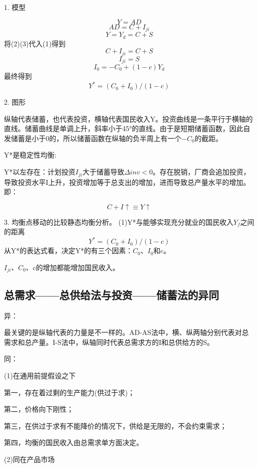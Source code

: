 \documentclass{article}
\begin{document}
1. 模型

\begin{equation}
	Y=AD
\end{equation}
\begin{equation}
	AD=C+I_{ji}
\end{equation}
\begin{equation}
	Y=Y_d=C+S
\end{equation}
将(2)(3)代入(1)得到
\[
C+I_{ji}=C+S
\]
\[
I_{ji}=S
\]
\[
I_{0}=-C_0+(1-c)Y_d
\]
最终得到
\[
Y^*=(C_0+I_0)/(1-c)
\]

\hspace*{\fill}

2. 图形

纵轴代表储蓄，也代表投资，横轴代表国民收入Y。投资曲线是一条平行于横轴的直线。储蓄曲线是单调上升，斜率小于45°的直线。由于是短期储蓄函数，因此自发储蓄是小于0的，所以储蓄函数在纵轴的负半周上有一个$ -C_0 $的截距。

Y*是稳定性均衡:

Y*以左存在：计划投资$ I_{ji} $大于储蓄导致$ \Delta inv<0 $。存在脱销，厂商会追加投资，导致投资水平I上升，投资增加等于总支出的增加，进而导致总产量水平的增加。即：

\[
C+I\uparrow\equiv Y\uparrow
\]

\hspace*{\fill}

3. 均衡点移动的比较静态均衡分析。
(1)Y*与能够实现充分就业的国民收入$ Y_f $之间的距离
\[
Y^*=(C_0+I_0)/(1-c)
\]
从Y*的表达式看，决定Y*的有三个因素：$ C_0 $、$ I_0 $和c。

$ I_{ji} $、$ C_0 $、c的增加都能增加国民收入。

\subsection{总需求——总供给法与投资——储蓄法的异同}
异：

最关键的是纵轴代表的力量是不一样的。AD-AS法中，横、纵两轴分别代表对总需求和总产量。I-S法中，纵轴同时代表总需求方的I和总供给方的S。

同：

(1)在通用前提假设之下

第一，存在着过剩的生产能力(供过于求)；

第二，价格向下刚性；

第三，在供过于求有不能降价的情况下，供给是无限的，不会约束需求；

第四，均衡的国民收入由总需求单方面决定。

(2)同在产品市场
\end{document}
